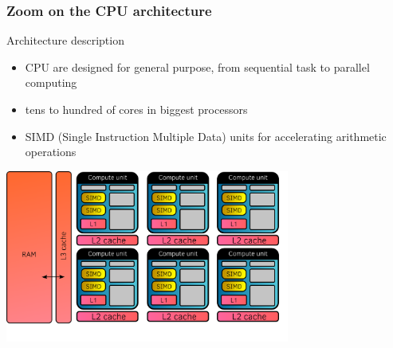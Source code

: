 \documentclass[aspectratio=169]{beamer}
\begin{document}

\begin{frame}
    \frametitle{Zoom on the CPU architecture}
    Architecture description

    \begin{itemize}
        \item CPU are designed for general purpose, from sequential task to parallel computing
        \item tens to hundred of cores in biggest processors
        \item SIMD (Single Instruction Multiple Data) units for accelerating arithmetic operations
    \end{itemize}
    
    \begin{center}
        \includegraphics[width=0.7\textwidth]{../../images/cpu_architecture.png}
    \end{center}
    
\end{frame}


\end{document}
